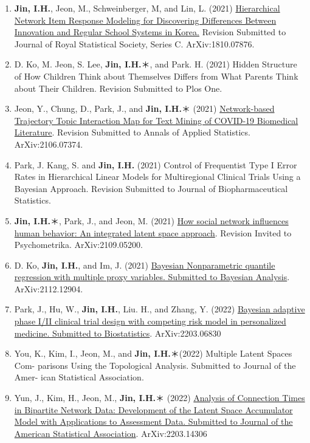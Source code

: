 \documentclass[
]{book}
\begin{document}
\begin{enumerate}
\def\labelenumi{\arabic{enumi}.}
\item
  \textbf{Jin, I.H.}, Jeon, M., Schweinberger, M, and Lin, L. (2021) \href{https://arxiv.org/abs/1810.07876}{Hierarchical Network Item Response Modeling for Discovering Differences Between Innovation and Regular School Systems in Korea.} Revision Submitted to Journal of Royal Statistical Society, Series C. ArXiv:1810.07876.
\item
  D. Ko, M. Jeon, S. Lee, \textbf{Jin, I.H.}＊, and Park. H. (2021) Hidden Structure of How Children Think about Themselves Differs from What Parents Think about Their Children. Revision Submitted to Plos One.
\item
  Jeon, Y., Chung, D., Park, J., and \textbf{Jin, I.H.}＊ (2021) \href{https://arxiv.org/abs/2106.07374}{Network-based Trajectory Topic Interaction Map for Text Mining of COVID-19 Biomedical Literature}. Revision Submitted to Annals of Applied Statistics. ArXiv:2106.07374.
\item
  Park, J. Kang, S. and \textbf{Jin, I.H.} (2021) Control of Frequentist Type I Error Rates in Hierarchical Linear Models for Multiregional Clinical Trials Using a Bayesian Approach. Revision Submitted to Journal of Biopharmaceutical Statistics.
\item
  \textbf{Jin, I.H.}＊, Park, J., and Jeon, M. (2021) \href{https://arxiv.org/abs/2109.05200}{How social network influences human behavior: An integrated latent space approach}. Revision Invited to Psychometrika. ArXiv:2109.05200.
\item
  D. Ko, \textbf{Jin, I.H.}, and Im, J. (2021) \href{https://arxiv.org/abs/2112.12904}{Bayesian Nonparametric quantile regression with multiple proxy variables. Submitted to Bayesian Analysis}. ArXiv:2112.12904.
\item
  Park, J., Hu, W., \textbf{Jin, I.H.}, Liu. H., and Zhang, Y. (2022) \href{https://arxiv.org/abs/2203.06830}{Bayesian adaptive phase I/II clinical trial design with competing risk model in personalized medicine. Submitted to Biostatistics}. ArXiv:2203.06830
\item
  You, K., Kim, I., Jeon, M., and \textbf{Jin, I.H.}＊(2022) Multiple Latent Spaces Com- parisons Using the Topological Analysis. Submitted to Journal of the Amer- ican Statistical Association.
\item
  Yun, J., Kim, H., Jeon, M., \textbf{Jin, I.H.}＊ (2022) \href{https://arxiv.org/abs/2203.14306}{Analysis of Connection Times in Bipartite Network Data: Development of the Latent Space Accumulator Model with Applications to Assessment Data. Submitted to Journal of the American Statistical Association}. ArXiv:2203.14306

\end{enumerate}
\end{document}
